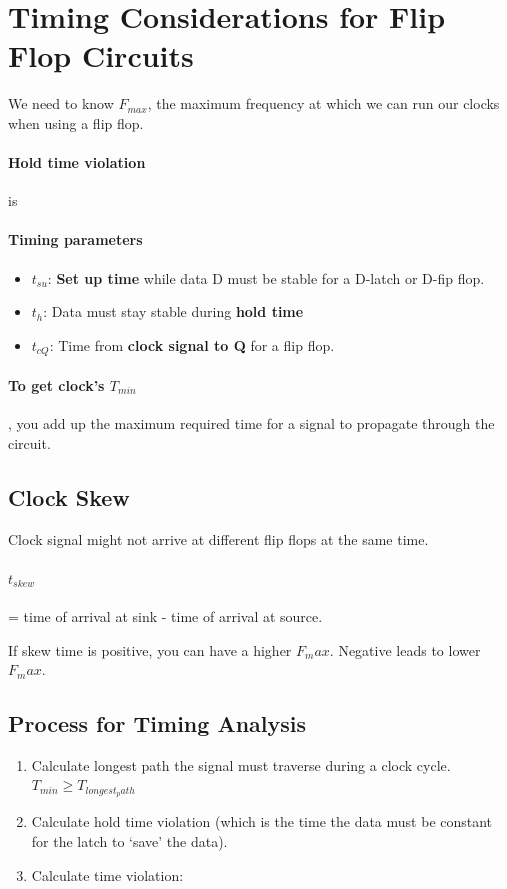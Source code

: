 \documentclass[a4paper,12pt]{report}
\begin{document}
\section{Timing Considerations for Flip Flop Circuits}
We need to know $F_{max}$, the maximum frequency at which we can run our clocks when using a flip flop.

\paragraph{Hold time violation } is 
\paragraph{Timing parameters } 
\begin{itemize}
\item $t_{su}$: \textbf{Set up time} while data D must be stable for a D-latch or D-fip flop. 
\item $t_h$: Data must stay stable during \textbf{hold time}
\item $t_{cQ}$: Time from \textbf{clock signal to Q} for a flip flop.
\end{itemize}

\paragraph{To get clock's $T_{min}$}, you add up the maximum required time for a signal to propagate through the circuit. 

\subsection{Clock Skew}
Clock signal might not arrive at different flip flops at the same time. 

\paragraph{$t_{skew}$} = time of arrival at sink - time of arrival at source.

If skew time is positive, you can have a higher $F_max$. Negative leads to lower $F_max$. 

\subsection{Process for Timing Analysis}
\begin{enumerate}
\item Calculate longest path the signal must traverse during a clock cycle. $T_{min} \geq T_{longest_path}$
\item Calculate hold time violation (which is the time the data must be constant for the latch to `save' the data). 
\item Calculate time violation: 
\end{enumerate}
\end{document}
